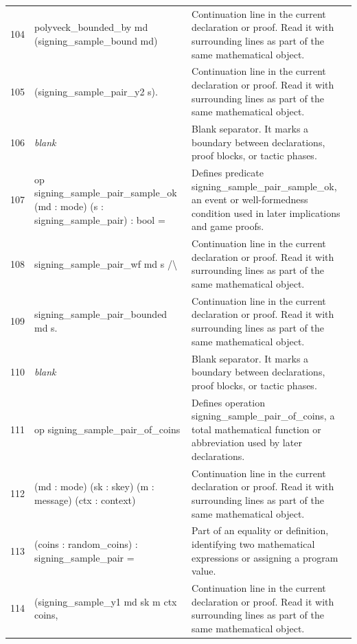 \documentclass[10pt]{article}
\begin{document}
\begin{longtable}{r L{0.53\textwidth} L{0.37\textwidth}}
104 & {\ttfamily\scriptsize   polyveck\_bounded\_by md (signing\_sample\_bound md)} & Continuation line in the current declaration or proof.  Read it with surrounding lines as part of the same mathematical object. \\
105 & {\ttfamily\scriptsize     (signing\_sample\_pair\_y2 s).} & Continuation line in the current declaration or proof.  Read it with surrounding lines as part of the same mathematical object. \\
106 & {\ttfamily\scriptsize \emph{blank}} & Blank separator.  It marks a boundary between declarations, proof blocks, or tactic phases. \\
107 & {\ttfamily\scriptsize op signing\_sample\_pair\_sample\_ok (md : mode) (s : signing\_sample\_pair) : bool =} & Defines predicate signing\_sample\_pair\_sample\_ok, an event or well-formedness condition used in later implications and game proofs. \\
108 & {\ttfamily\scriptsize   signing\_sample\_pair\_wf md s /\textbackslash{}} & Continuation line in the current declaration or proof.  Read it with surrounding lines as part of the same mathematical object. \\
109 & {\ttfamily\scriptsize   signing\_sample\_pair\_bounded md s.} & Continuation line in the current declaration or proof.  Read it with surrounding lines as part of the same mathematical object. \\
110 & {\ttfamily\scriptsize \emph{blank}} & Blank separator.  It marks a boundary between declarations, proof blocks, or tactic phases. \\
111 & {\ttfamily\scriptsize op signing\_sample\_pair\_of\_coins} & Defines operation signing\_sample\_pair\_of\_coins, a total mathematical function or abbreviation used by later declarations. \\
112 & {\ttfamily\scriptsize    (md : mode) (sk : skey) (m : message) (ctx : context)} & Continuation line in the current declaration or proof.  Read it with surrounding lines as part of the same mathematical object. \\
113 & {\ttfamily\scriptsize    (coins : random\_coins) : signing\_sample\_pair =} & Part of an equality or definition, identifying two mathematical expressions or assigning a program value. \\
114 & {\ttfamily\scriptsize   (signing\_sample\_y1 md sk m ctx coins,} & Continuation line in the current declaration or proof.  Read it with surrounding lines as part of the same mathematical object. \\

\end{longtable}
\end{document}
